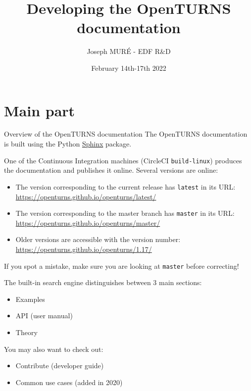 \documentclass[8pt, handout]{beamer}
\title{Developing the OpenTURNS documentation}
\author{Joseph MUR\'E - EDF R\&D}
\date{February 14th-17th 2022}
\institute{\small OpenTURNS Consortium}
\begin{document}
\frame{\titlepage}

\part{Main part}


\begin{frame}{Overview of the OpenTURNS documentation}
The OpenTURNS documentation is built using the Python \href{https://www.sphinx-doc.org/en/master/index.html}{\alert{Sphinx}} package.

One of the Continuous Integration machines (CircleCI \texttt{build-linux})
produces the documentation and publishes it online.
Several versions are online:

\begin{itemize}
\item The version corresponding to the current release has \alert{\texttt{latest}} in its URL:
\url{https://openturns.github.io/openturns/latest/}
\item The version corresponding to the master branch has \alert{\texttt{master}} in its URL:
\url{https://openturns.github.io/openturns/master/}
\item Older versions are accessible with the version number: \url{https://openturns.github.io/openturns/1.17/}
\end{itemize}

If you spot a mistake, make sure you are looking at \texttt{master} before correcting!

The built-in search engine distinguishes between 3 main sections:

\begin{itemize}
    \item \alert{Examples}
    \item \alert{API} (user manual)
    \item \alert{Theory}
\end{itemize}

You may also want to check out:

\begin{itemize}
    \item \alert{Contribute} (developer guide)
    \item \alert{Common use cases} (added in 2020)
\end{itemize}
\end{frame}
\end{document}
